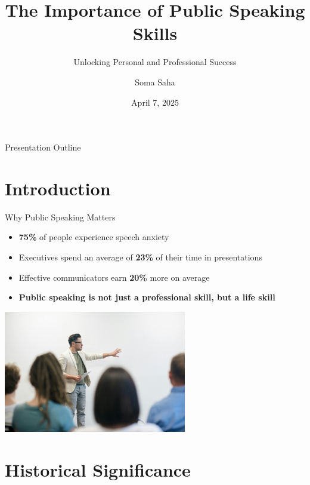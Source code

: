 \documentclass{beamer}
\title{The Importance of Public Speaking Skills}
\subtitle{Unlocking Personal and Professional Success}
\author{Soma Saha}
\date{April 7, 2025}
\institute{Shristi Global School}
\begin{document}
\begin{frame}
    \titlepage
\end{frame}

\begin{frame}{Presentation Outline}
    \tableofcontents
\end{frame}

\section{Introduction}

\begin{frame}{Why Public Speaking Matters}
    \begin{itemize}
        \item \textbf{75\%} of people experience speech anxiety
        \item Executives spend an average of \textbf{23\%} of their time in presentations
        \item Effective communicators earn \textbf{20\%} more on average
        \item \textbf{Public speaking is not just a professional skill, but a life skill}
    \end{itemize}
    
    \begin{center}
        \includegraphics[width=0.6\textwidth]{images/speaker.jpg}
    \end{center}
\end{frame}

\section{Historical Significance}
\end{document}
